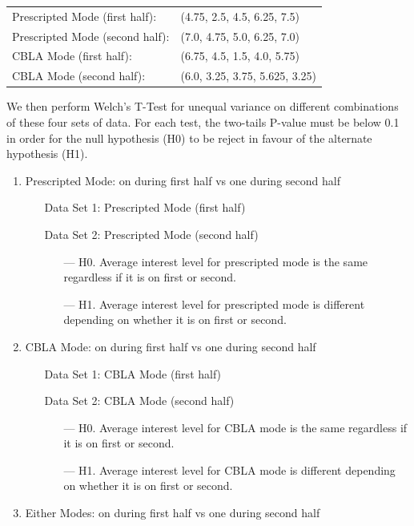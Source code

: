 \begin{tabular}{l l}
	Prescripted Mode (first half):      &(4.75, 2.5, 4.5, 6.25, 7.5) \\
	Prescripted Mode (second half):     &(7.0, 4.75, 5.0, 6.25, 7.0) \\
	CBLA Mode (first half):             &(6.75, 4.5, 1.5, 4.0, 5.75) \\
	CBLA Mode (second half):            &(6.0, 3.25, 3.75, 5.625, 3.25)	
\end{tabular}

We then perform Welch's T-Test for unequal variance on different combinations of these four sets of data. For each test, the two-tails P-value must be below 0.1 in order for the null hypothesis (H0) to be reject in favour of the alternate hypothesis (H1).

\begin{enumerate}
	\item Prescripted Mode: on during first half vs one during second half
		\begin{itemize}[align=left]
			\item[Data Set 1: ] Prescripted Mode (first half)
			\item[Data Set 2: ] Prescripted Mode (second half)
			\begin{itemize}
				\item[--- H0.] Average interest level for prescripted mode is the same regardless if it is on first or second.
				\item[--- H1.] Average interest level for prescripted mode is different depending on whether it is on first or second.
			\end{itemize}
		\end{itemize}
	\item CBLA Mode: on during first half vs one during second half
		\begin{itemize}[align=left]
			\item[Data Set 1: ] CBLA Mode (first half)
			\item[Data Set 2: ] CBLA Mode (second half)
			\begin{itemize}
				\item[--- H0.] Average interest level for CBLA mode is the same regardless if it is on first or second.
				\item[--- H1.] Average interest level for CBLA mode is different depending on whether it is on first or second.			
			\end{itemize}
		\end{itemize}
	\item Either Modes: on during first half vs one during second half

\end{enumerate}
